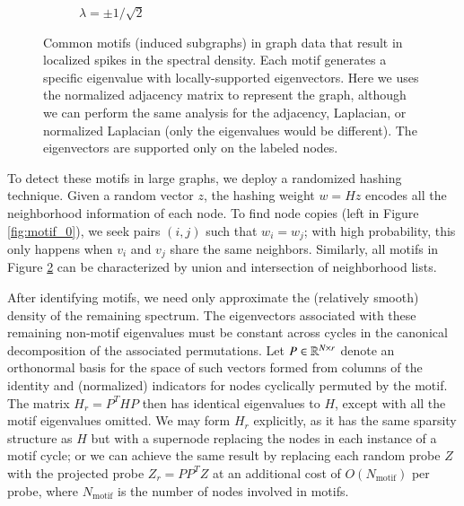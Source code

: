 \begin{figure}[htp]
\begin{center}
\begin{subfigure}{0.47\textwidth}
		\vspace{3.5cm}
		\caption{$\lambda = \pm1/\sqrt{2}$}\label{fig:motif_sqrt2}
  \end{subfigure}
  \caption{Common motifs (induced subgraphs) in graph data that result in
  localized spikes in the spectral density. Each motif generates a specific
  eigenvalue with locally-supported eigenvectors. Here we uses the normalized
  adjacency matrix to represent the graph, although we can perform the same
  analysis for the adjacency, Laplacian, or normalized Laplacian (only the
  eigenvalues would be different). The eigenvectors are supported only on the
  labeled nodes.}\label{fig:motifs}
  \end{center}
\end{figure}
\vspace{-.5cm}

To detect these motifs in large graphs, we deploy a randomized hashing
technique. Given a random vector $z$, the hashing weight $w=Hz$ encodes all
the neighborhood information of each node. To find node copies (left in Figure 
\ref{fig:motif_0}), we seek pairs $(i, j)$ such that $w_i=w_j$; with high
probability, this only happens when $v_i$ and $v_j$ share the same neighbors.
Similarly, all motifs in Figure \ref{fig:motifs} can be characterized by union
and intersection of neighborhood lists.

After identifying motifs, we need only approximate the (relatively smooth)
density of the remaining spectrum.  The eigenvectors associated with these
remaining non-motif eigenvalues must be constant across cycles in the canonical
decomposition of the associated permutations.  Let $P \in \mathbb{R}^{N \times r}$
denote an orthonormal basis for the space of such vectors formed from columns of
the identity and (normalized) indicators for nodes cyclically permuted by the
motif.  The matrix $H_r = P^T H P$ then has identical eigenvalues to $H$, except
with all the motif eigenvalues omitted. We may form $H_r$ explicitly, as it has
the same sparsity structure as $H$ but with a supernode replacing the nodes in
each instance of a motif cycle; or we can achieve the same result by replacing
each random probe $Z$ with the projected probe $Z_r = PP^T Z$ at an additional
cost of $O(N_{\mathrm{motif}})$ per probe, where $N_{\mathrm{motif}}$ is the
number of nodes involved in motifs.

